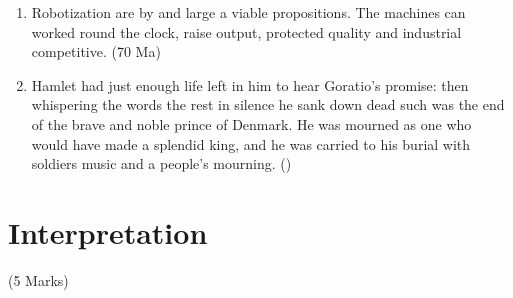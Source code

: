 \documentclass[12pt]{article}
\begin{document}
\begin{enumerate}
      \item Robotization are by and large a viable propositions. The machines can worked round the clock, raise output, protected quality and industrial competitive. \hfill (70 Ma)

      \item Hamlet had just enough life left in him to hear Goratio's promise: then whispering the words the rest in silence he sank down dead such was the end of the brave and noble prince of Denmark. He was mourned as one who would have made a splendid king, and he was carried to his burial with soldiers music and a people's mourning. \hfill ()
    \end{enumerate}
\pagebreak

\section{Interpretation}
  \begin{center}(5 Marks)\end{center}
\end{document}
